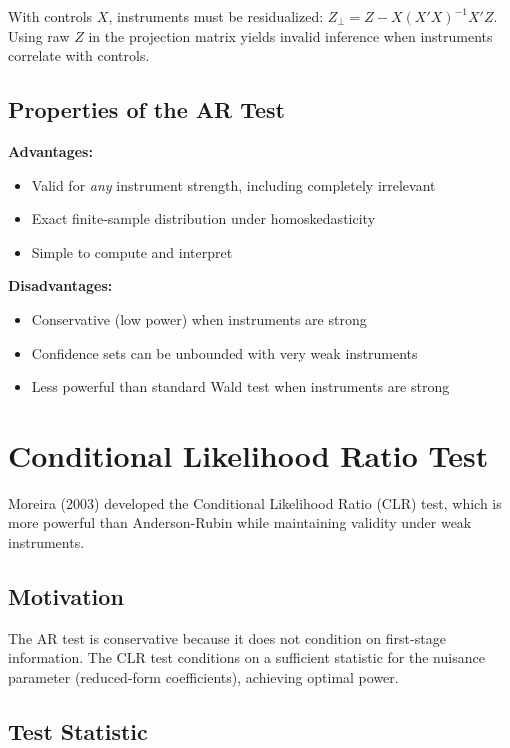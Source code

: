 \begin{remark}
With controls $X$, instruments must be residualized: $Z_\perp = Z - X(X'X)^{-1}X'Z$. Using raw $Z$ in the projection matrix yields invalid inference when instruments correlate with controls.
\end{remark}

\subsection{Properties of the AR Test}

\textbf{Advantages:}
\begin{itemize}
    \item Valid for \emph{any} instrument strength, including completely irrelevant
    \item Exact finite-sample distribution under homoskedasticity
    \item Simple to compute and interpret
\end{itemize}

\textbf{Disadvantages:}
\begin{itemize}
    \item Conservative (low power) when instruments are strong
    \item Confidence sets can be unbounded with very weak instruments
    \item Less powerful than standard Wald test when instruments are strong
\end{itemize}


\section{Conditional Likelihood Ratio Test}
\label{sec:clr_test}

Moreira (2003) developed the Conditional Likelihood Ratio (CLR) test, which is more powerful than Anderson-Rubin while maintaining validity under weak instruments.

\subsection{Motivation}

The AR test is conservative because it does not condition on first-stage information. The CLR test conditions on a sufficient statistic for the nuisance parameter (reduced-form coefficients), achieving optimal power.

\subsection{Test Statistic}

